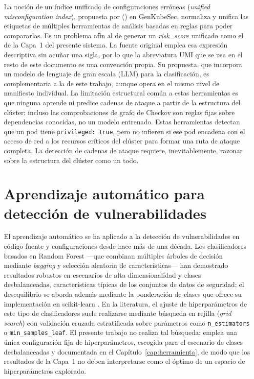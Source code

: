 La noción de un índice unificado de configuraciones erróneas (\textit{unified
misconfiguration index}), propuesta por
\citeauthor{Malul2024} (\citeyear{Malul2024}) en GenKubeSec, normaliza y
unifica las etiquetas de múltiples herramientas de análisis basadas en reglas para
poder compararlas. Es un problema afín al de generar un \textit{risk\_score}
unificado como el de la Capa~1 del presente sistema. La fuente original emplea esa
expresión descriptiva sin acuñar una sigla, por lo que la abreviatura
\acs{UMI} que se usa en el resto de este documento es una convención
propia. Su propuesta, que incorpora un modelo de
lenguaje de gran escala (\acs{LLM}) para la clasificación, es complementaria a la de
este trabajo, aunque opera en el mismo nivel de manifiesto individual.
La limitación estructural común a estas herramientas es que ninguna aprende ni predice
cadenas de ataque a partir de la estructura del clúster: incluso las comprobaciones de
grafo de Checkov son reglas fijas sobre dependencias conocidas, no un modelo
entrenado. Estas herramientas detectan que un pod tiene \texttt{privileged: true}, pero no infieren
si ese pod encadena con el acceso de red a los recursos críticos del clúster para formar
una ruta de ataque completa. La detección de cadenas de ataque requiere, inevitablemente,
razonar sobre la estructura del clúster como un todo.

\section{Aprendizaje automático para detección de vulnerabilidades}
\label{sec:ml_vulnerabilidades}

El aprendizaje automático se ha aplicado a la detección de vulnerabilidades en
código fuente y configuraciones desde hace más de una década. Los clasificadores
basados en Random Forest \citep{Breiman2001} —que combinan múltiples árboles
de decisión mediante \textit{bagging} y selección aleatoria de características— han
demostrado resultados robustos en escenarios de alta dimensionalidad y clases
desbalanceadas, características típicas de los conjuntos de datos de seguridad; el
desequilibrio se aborda además mediante la ponderación de clases que ofrece su
implementación en scikit-learn \citep{Pedregosa2011}. En la literatura, el
ajuste de hiperparámetros de este tipo de clasificadores suele realizarse mediante
búsqueda en rejilla (\textit{grid search}) con validación cruzada estratificada
sobre parámetros como \texttt{n\_estimators} o \texttt{min\_samples\_leaf}. El
presente trabajo no realiza tal búsqueda: emplea una única configuración fija de
hiperparámetros, escogida para el escenario de clases desbalanceadas y documentada
en el Capítulo~\ref{cap:herramienta}, de modo que los resultados de la Capa~1 no
deben interpretarse como el óptimo de un espacio de hiperparámetros explorado.

